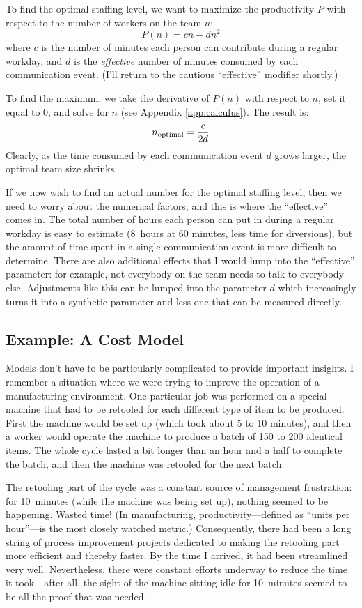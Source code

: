 To find the optimal staffing level, we want to maximize the
productivity $P$ with respect to the number of workers on the team
$n$:
%
\[
P(n) = c n - d n^2
\]
%
where $c$ is the number of minutes each person can contribute during a
regular workday, and $d$ is the \emph{effective} number of minutes
consumed by each communication event. (I'll return to the cautious
``effective'' modifier shortly.)

To find the maximum, we take the derivative of $P(n)$ with respect to
$n$, set it equal to $0$, and solve for $n$ (see Appendix
\ref{app:calculus}).  The result is:
%
\[
n_{\text{\scriptsize optimal}} = \frac{c}{2d}
\]
%
Clearly, as the time consumed by each communication event $d$ grows
larger, the optimal team size shrinks.

If we now wish to find an actual number for the optimal staffing
level, then we need to worry about the numerical factors, and this is
where the ``effective'' comes in. The total number of hours each
person can put in during a regular workday is easy to estimate 
(8~hours at 60 minutes, less time for diversions), but the amount of
time spent in a single communication event is more difficult to
determine. There are also additional effects that I would lump into
the ``effective'' parameter: for example, not everybody on the team
needs to talk to everybody else. Adjustments like this can be lumped
into the parameter $d$ which increasingly turns it into a synthetic
parameter and less one that can be measured directly.

\subsection{Example: A Cost Model}
Models don't have to be particularly complicated to provide important
insights. I remember a situation where we were trying to improve the
operation of a manufacturing environment. One particular job was
performed\vadjust{\pagebreak} on a special machine that had to be retooled for each
different type of item to be produced. First the machine would be set
up (which took about 5 to 10 minutes), and then a worker would
operate the machine to produce a batch of 150 to 200 identical items.
The whole cycle lasted a bit longer than an hour and a half to
complete the batch, and then the machine was retooled for the next
batch.

The retooling part of the cycle was a constant source of management
frustration: for 10~minutes (while the machine was being set up),
nothing seemed to be happening. Wasted time! (In manufacturing,
productivity---defined as ``units per hour''---is the most closely
watched metric.)  Consequently, there had been a long string of
process improvement projects dedicated to making the retooling part
more efficient and thereby faster. By the time I arrived, it had been
streamlined very well. Nevertheless, there were constant efforts
underway to reduce the time it took---after all, the sight of the
machine sitting idle for 10~minutes seemed to be all the proof that
was needed.

